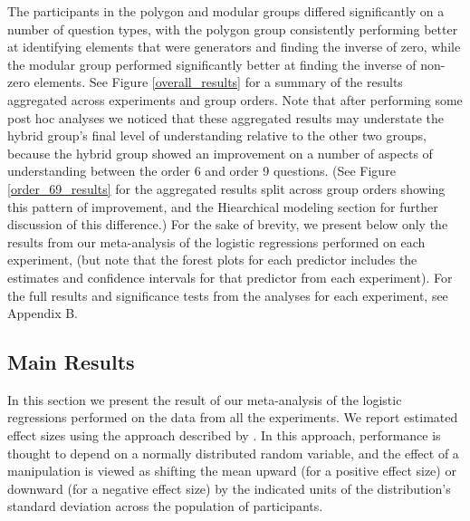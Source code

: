 \documentclass[man,10pt]{apa6}
\begin{document}
The participants in the polygon and modular groups differed significantly on a number of question types, with the polygon group consistently performing better at identifying elements that were generators and finding the inverse of zero, while the modular group performed significantly better at finding the inverse of non-zero elements. See Figure \ref{overall_results} for a summary of the results aggregated across experiments and group orders. Note that after performing some post hoc analyses we noticed that these aggregated results may understate the hybrid group's final level of understanding relative to the other two groups, because the hybrid group showed an improvement on a number of aspects of understanding between the order 6 and order 9 questions. (See Figure \ref{order_69_results} for the aggregated results split across group orders showing this pattern of improvement, and the Hiearchical modeling section for further discussion of this difference.) For the sake of brevity, we present below only the results from our meta-analysis of the logistic regressions performed on each experiment, (but note that the forest plots for each predictor includes the estimates and confidence intervals for that predictor from each experiment). For the full results and significance tests from the analyses for each experiment, see Appendix B.  
\subsection{Main Results}
In this section we present the result of our meta-analysis of the logistic regressions performed on the data from all the experiments. We report estimated effect sizes using the approach described by . In this approach, performance is thought to depend on a normally distributed random variable, and the effect of a manipulation is viewed as shifting the mean upward (for a positive effect size) or downward (for a negative effect size) by the indicated units of the distribution's standard deviation across the population of participants.  
\end{document}

